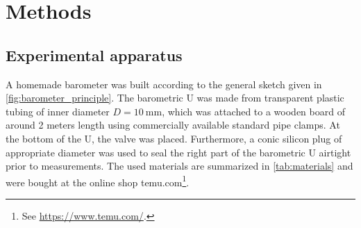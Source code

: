 \documentclass[a4paper,11pt, twocolumn]{article}
\begin{document}
\section{Methods}
\subsection{Experimental apparatus}
A homemade barometer was built according to the general sketch given in \cref{fig:barometer_principle}. The barometric U was made from transparent plastic tubing of inner diameter $D = \SI{10}{\milli\meter}$, which was attached to a wooden board of around 2 meters length using commercially available standard pipe clamps. At the bottom of the U, the valve was placed. Furthermore, a conic silicon plug of appropriate diameter was used to seal the right part of the barometric U airtight prior to measurements. The used materials are summarized in \cref{tab:materials} and were bought at the online shop temu.com\footnote{See \url{https://www.temu.com/}.}.
\end{document}
